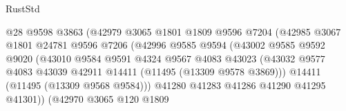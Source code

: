 \begin{lexlean}{RustStd}
\begin{coremodule}
                                        @28
                                        @9598
                                        @3863
                                        (@42979
                                          @3065
                                          @1801
                                          @1809
                                          @9596
                                          @7204
                                          (@42985
                                            @3067
                                            @1801
                                            @24781
                                            @9596
                                            @7206
                                            (@42996
                                              @9585
                                              @9594
                                              (@43002
                                                @9585
                                                @9592
                                                @9020
                                                (@43010
                                                  @9584
                                                  @9591
                                                  @4324
                                                  @9567
                                                  @4083
                                                  @43023
                                                  (@43032
                                                    @9577
                                                    @4083
                                                    @43039
                                                    @42911
                                                    @14411
                                                    (@11495 (@13309 @9578 @3869)))
                                                  @14411
                                                  (@11495 (@13309 @9568 @9584)))
                                                @41280
                                                @41283
                                                @41286
                                                @41290
                                                @41295
                                                @41301))
                                            (@42970
                                              @3065
                                              @120
                                              @1809

\end{coremodule}
\end{lexlean}
